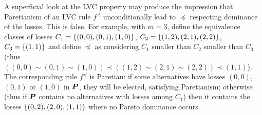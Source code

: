 \documentclass[version=3.21, pagesize, twoside=off, bibliography=totoc, DIV=calc, fontsize=12pt, a4paper]{scrartcl}
\begin{document}
\begin{remark}
	A superficial look at the LVC property may produce the impression that Paretianism of an LVC rule $f^\preceq$ unconditionally lead to $\preceq$ respecting dominance of the losses. This is false. For example, with $m = 3$, define the equivalence classes of losses $C_1 = \{(0, 0), (0, 1), (1, 0)\}$, $C_2 = \{(1, 2), (2, 1), (2, 2)\}$, $C_3 = \{(1, 1)\}$ and define $\preceq$ as considering $C_1$ smaller than $C_2$ smaller than $C_3$ (thus $((0, 0) \sim (0, 1) \sim (1, 0)) \prec ((1, 2) \sim (2, 1) \sim (2, 2)) \prec (1, 1)$). The corresponding rule $f^\preceq$ is Paretian: if some alternatives have losses $(0, 0)$, $(0, 1)$ or $(1, 0)$ in $\bm{P}$, they will be elected, satisfying Paretianism; otherwise (thus if $\bm{P}$ contains no alternatives with losses among $C_1$) then it contains the losses $\{(0, 2), (2, 0), (1, 1)\}$ where no Pareto dominance occurs.
\end{remark}
\end{document}
